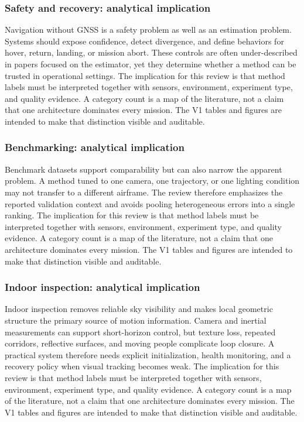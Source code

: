 \documentclass[
  journal,
  10pt]{IEEEtran}
\begin{document}
\subsubsection{Safety and recovery: analytical
implication}\label{safety-and-recovery-analytical-implication-2}

Navigation without GNSS is a safety problem as well as an estimation
problem. Systems should expose confidence, detect divergence, and define
behaviors for hover, return, landing, or mission abort. These controls
are often under-described in papers focused on the estimator, yet they
determine whether a method can be trusted in operational settings. The
implication for this review is that method labels must be interpreted
together with sensors, environment, experiment type, and quality
evidence. A category count is a map of the literature, not a claim that
one architecture dominates every mission. The V1 tables and figures are
intended to make that distinction visible and auditable.

\subsubsection{Benchmarking: analytical
implication}\label{benchmarking-analytical-implication-2}

Benchmark datasets support comparability but can also narrow the
apparent problem. A method tuned to one camera, one trajectory, or one
lighting condition may not transfer to a different airframe. The review
therefore emphasizes the reported validation context and avoids pooling
heterogeneous errors into a single ranking. The implication for this
review is that method labels must be interpreted together with sensors,
environment, experiment type, and quality evidence. A category count is
a map of the literature, not a claim that one architecture dominates
every mission. The V1 tables and figures are intended to make that
distinction visible and auditable.

\subsubsection{Indoor inspection: analytical
implication}\label{indoor-inspection-analytical-implication-3}

Indoor inspection removes reliable sky visibility and makes local
geometric structure the primary source of motion information. Camera and
inertial measurements can support short-horizon control, but texture
loss, repeated corridors, reflective surfaces, and moving people
complicate loop closure. A practical system therefore needs explicit
initialization, health monitoring, and a recovery policy when visual
tracking becomes weak. The implication for this review is that method
labels must be interpreted together with sensors, environment,
experiment type, and quality evidence. A category count is a map of the
literature, not a claim that one architecture dominates every mission.
The V1 tables and figures are intended to make that distinction visible
and auditable.
\end{document}
